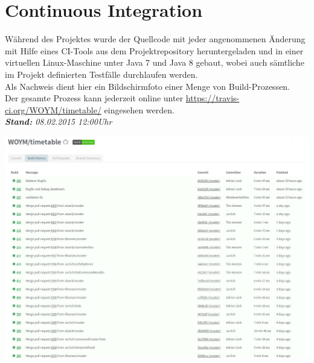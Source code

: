 \documentclass[fontsize=12pt,paper=a4,twoside]{scrartcl}
\begin{document}
\newpage

\section{Continuous Integration}

Während des Projektes wurde der Quellcode mit jeder angenommenen Änderung mit Hilfe eines CI-Tools aus dem Projektrepository heruntergeladen und in einer virtuellen Linux-Maschine unter Java 7 und Java 8 gebaut, wobei auch sämtliche im Projekt definierten Testfälle durchlaufen werden.\\
Als Nachweis dient hier ein Bildschirmfoto einer Menge von Build-Prozessen.\\
Der gesamte Prozess kann jederzeit online unter \url{https://travis-ci.org/WOYM/timetable/} eingesehen werden.\\

\textit{\textbf{Stand:} 08.02.2015 12:00Uhr}

\includegraphics[width=\textwidth]{screenshot_CI.png}
\end{document}
